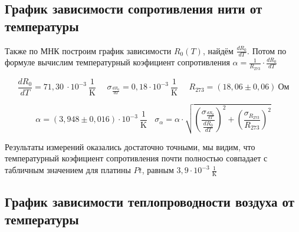 \documentclass[a4paper,12pt]{article}
\begin{document}
        \subsection{График зависимости сопротивления нити от температуры}

            Также по МНК построим график зависимости $R_0(T)$, найдём $\frac{dR_0}{dT}$. Потом по формуле вычислим температурный коэфициент сопротивления $\alpha = \frac{1}{R_{273}}\cdot \frac{dR_0}{dT}$

           \[\frac{dR_0}{dT} = 71,30 \ \cdot 10^{-3} \ \frac{1}{\text{K}} \ \ \ \ \ \ \sigma_{\frac{dR_0}{dT}} = 0,18 \cdot 10^{-3} \ \frac{1}{\text{K}}  \ \ \ \ \ \   R_{273} = (18,06 \pm 0,06) \ \text{Ом}\]

          \[\alpha = (3,948 \pm 0,016)  \cdot 10^{-3} \ \frac{1}{\text{K}} \ \ \ \  \sigma_{\alpha} = \alpha \cdot \sqrt{\left( \frac{\sigma_{\frac{dR_0}{dT}}}{ \frac{dR_0}{dT}} \right)^2 + \left( \frac{\sigma_{R_{273}}}{R_{273}} \right)^2}\]

        \newline
        Результаты измерений оказались достаточно точными, мы видим, что температурный коэфициент сопротивления почти полностью совпадает с табличным значением для платины $Pt$, равным $3,9  \cdot 10^{-3} \ \frac{1}{\text{K}}$
        \newpage
            \begin{figure}[ht]
                \label{RT_graph}
            \end{figure}

        \subsection{График зависимости теплопроводности воздуха от температуры}
\end{document}
